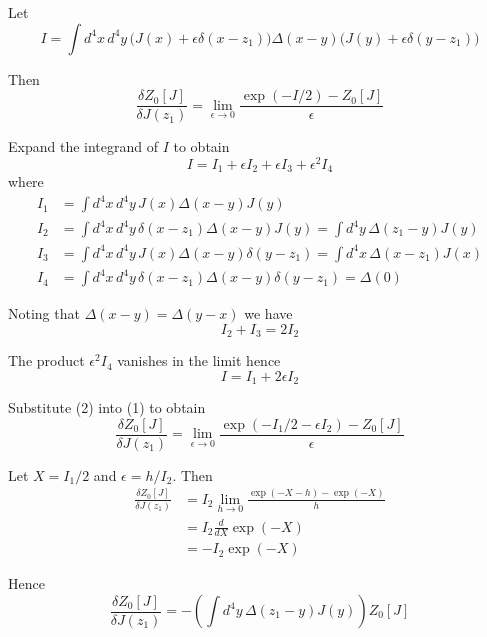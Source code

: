 


\bigskip
Let
\begin{equation*}
I=\int d^4x\,d^4y\,
\big(J(x)+\epsilon\delta(x-z_1)\big)
\Delta(x-y)
\big(J(y)+\epsilon\delta(y-z_1)\big)
\end{equation*}

Then
\begin{equation*}
\frac{\delta Z_0[J]}{\delta J(z_1)}=\lim_{\epsilon\rightarrow0}
\frac{\exp(-I/2)-Z_0[J]}{\epsilon}
\tag{1}
\end{equation*}

Expand the integrand of $I$ to obtain
\begin{equation*}
I=I_1+\epsilon I_2+\epsilon I_3+\epsilon^2 I_4
\end{equation*}
where
\begin{align*}
I_1&=\int d^4x\,d^4y\,J(x)\Delta(x-y)J(y)
\\
I_2&=\int d^4x\,d^4y\,\delta(x-z_1)\Delta(x-y)J(y)=\int d^4y\,\Delta(z_1-y)J(y)
\\
I_3&=\int d^4x\,d^4y\,J(x)\Delta(x-y)\delta(y-z_1)=\int d^4x\,\Delta(x-z_1)J(x)
\\
I_4&=\int d^4x\,d^4y\,\delta(x-z_1)\Delta(x-y)\delta(y-z_1)=\Delta(0)
\end{align*}

Noting that $\Delta(x-y)=\Delta(y-x)$ we have
\begin{equation*}
I_2+I_3=2I_2
\end{equation*}

The product $\epsilon^2I_4$ vanishes in the limit hence
\begin{equation*}
I=I_1+2\epsilon I_2
\tag{2}
\end{equation*}

Substitute (2) into (1) to obtain
\begin{equation*}
\frac{\delta Z_0[J]}{\delta J(z_1)}=\lim_{\epsilon\rightarrow0}
\frac{\exp(-I_1/2-\epsilon I_2)-Z_0[J]}{\epsilon}
\end{equation*}

Let $X=I_1/2$ and $\epsilon=h/I_2$.
Then
\begin{align*}
\frac{\delta Z_0[J]}{\delta J(z_1)}
&=I_2\lim_{h\rightarrow0}\frac{\exp(-X-h)-\exp(-X)}{h}
\\
&=I_2\frac{d}{dX}\exp(-X)
\\
&=-I_2\exp(-X)
\end{align*}

Hence
\begin{equation*}
\frac{\delta Z_0[J]}{\delta J(z_1)}=-\left(\int d^4y\,\Delta(z_1-y)J(y)\right)Z_0[J]
\end{equation*}


